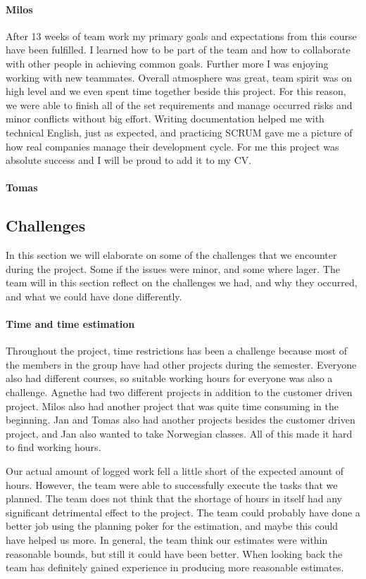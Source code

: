 \paragraph{Milos}
After 13 weeks of team work my primary goals and expectations from this course have been fulfilled. I learned how to be part of the team and how to collaborate with other people in achieving common goals. Further more I was enjoying working with new teammates. Overall atmosphere was great, team spirit was on high level and we even spent time together beside this project. For this reason, we were able to finish all of the set requirements and manage occurred risks and minor conflicts without big effort. Writing documentation helped me with technical English, just as expected, and practicing SCRUM gave me a picture of how real companies manage their development cycle. For me this project was absolute success and I will be proud to add it to my CV.

\paragraph{Tomas}

\subsection{Challenges}
In this section we will elaborate on some of the challenges that we encounter during the project. Some if the issues were minor, and some where lager. The team will in this section reflect on the challenges we had, and why they occurred, and what we could have done differently.

\paragraph{Time and time estimation}

Throughout the project, time restrictions has been a challenge because most of the members in the group have had other projects during the semester. Everyone also had different courses, so suitable working hours for everyone was also a challenge. Agnethe had two different projects in addition to the customer driven project. Milos also had another project that was quite time consuming in the beginning. Jan and Tomas also had another projects besides the customer driven project, and Jan also wanted to take Norwegian classes. All of this made it hard to find working hours. 

Our actual amount of logged work fell a little short of the expected amount of hours. However, the team were able to successfully execute the tasks that we planned.   
The team does not think that the shortage of hours in itself had any significant detrimental effect to the project. The team could probably have done a better job using the planning poker for the estimation, and maybe this could have helped us more. In general, the team think our estimates were within reasonable bounds, but still it could have been better. When looking back the team has definitely gained experience in producing more reasonable estimates.

